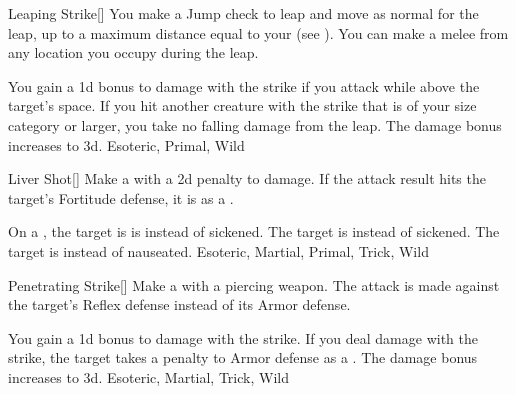 \lowercase{\hypertarget{maneuver:Leaping Strike}{}}\label{maneuver:Leaping Strike}
\hypertarget{maneuver:Leaping Strike}{}
\begin{freeability}{Leaping Strike}[]
You make a Jump check to leap and move as normal for the leap, up to a maximum distance equal to your  (see ).
You can make a melee  from any location you occupy during the leap.

\rankline
{} You gain a \plus1d bonus to damage with the strike if you attack while above the target's space.
 If you hit another creature with the strike that is of your size category or larger, you take no falling damage from the leap.
 The damage bonus increases to \plus3d.
 Esoteric, Primal, Wild
\end{freeability}
\vspace{0.25em}



\lowercase{\hypertarget{maneuver:Liver Shot}{}}\label{maneuver:Liver Shot}
\hypertarget{maneuver:Liver Shot}{}
\begin{freeability}{Liver Shot}[]
Make a  with a \minus2d penalty to damage.
If the attack result hits the target's Fortitude defense,
it is  as a .

\rankline
{} On a , the target is is  instead of sickened.
 The target is  instead of sickened.
 The target is  instead of nauseated.
 Esoteric, Martial, Primal, Trick, Wild
\end{freeability}
\vspace{0.25em}



\lowercase{\hypertarget{maneuver:Penetrating Strike}{}}\label{maneuver:Penetrating Strike}
\hypertarget{maneuver:Penetrating Strike}{}
\begin{freeability}{Penetrating Strike}[]
Make a  with a piercing weapon.
The attack is made against the target's Reflex defense instead of its Armor defense.

\rankline
{} You gain a \plus1d bonus to damage with the strike.
 If you deal damage with the strike, the target takes a  penalty to Armor defense as a .
 The damage bonus increases to \plus3d.
 Esoteric, Martial, Trick, Wild
\end{freeability}
\vspace{0.25em}



